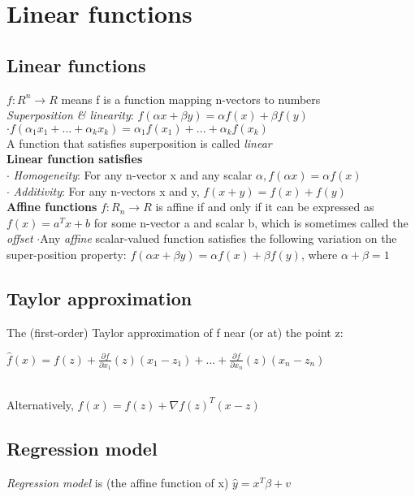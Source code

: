 \section{Linear functions}
\subsection{Linear functions} 
$f : R^n \to R$ means f is a function mapping n-vectors to numbers\\
\textit{Superposition \& linearity}: 
$f(\alpha x + \beta y) = \alpha f(x) + \beta f(y)$\\
$ \cdot f(\alpha_1 x_1 +...+ \alpha_k x_k) = \alpha_1 f(x_1)+...+ \alpha_k f(x_k)$\\
A function that satisfies superposition is called \textit{linear}\\
\textbf{Linear function satisfies}\\
$\cdot$ \textit{Homogeneity}: For any n-vector x and any scalar $\alpha, f(\alpha x) = \alpha f(x)$ \\
$\cdot$ \textit{Additivity}: For any n-vectors x and y, $f(x + y) = f(x) + f(y)$\\
\textbf{Affine functions}
$f:R_n \to R$ is affine if and only if it can be expressed as $f(x) = a^Tx + b$ for some n-vector a and scalar b, which is sometimes called the \textit{offset}
$\cdot$Any \textit{affine} scalar-valued function satisfies the following variation on the super-position property:
$f(\alpha x + \beta y) = \alpha f(x) + \beta f(y)$, where $\alpha + \beta = 1$

\subsection{Taylor approximation}
The (first-order) Taylor approximation of f near (or at) the point z:\\
\begin{scriptsize}
$\hat{f}(x)= f(z) + \frac{\partial f}{\partial x_1}(z)(x_1 - z_1) + ... +  \frac{\partial f}{\partial x_n}(z)(x_n - z_n)$
\end{scriptsize}\\
Alternatively,
$\hat{f}(x)=f(z)+ \nabla f(z)^T(x-z)$
\subsection{Regression model}
\textit{Regression model} is (the affine function of x) $\hat{y} = x^T \beta + v$
